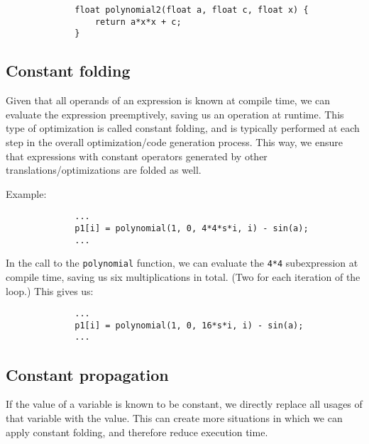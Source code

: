 \documentclass[twoside]{article}
\begin{document}
    \begin{figure}[h!]
        \centering
        \begin{verbatim}
        float polynomial2(float a, float c, float x) {
            return a*x*x + c;
        }
        \end{verbatim}
    \end{figure}
    
    \subsection{Constant folding}

    Given that all operands of an expression is known at compile time, we can evaluate the expression preemptively, saving us an operation at runtime.
    This type of optimization is called constant folding, and is typically performed at each step in the overall optimization/code generation process.
    This way, we ensure that expressions with constant operators generated by other translations/optimizations are folded as well.

    Example:

    \begin{figure}[h!]
        \centering
        \begin{verbatim}
        ...
        p1[i] = polynomial(1, 0, 4*4*s*i, i) - sin(a);
        ...
        \end{verbatim}
    \end{figure}

    In the call to the \texttt{polynomial} function, we can evaluate the \texttt{4*4} subexpression at compile time, saving us six multiplications in total. (Two for each iteration of the loop.)
    This gives us:

    \begin{figure}[h!]
        \centering
        \begin{verbatim}
        ...
        p1[i] = polynomial(1, 0, 16*s*i, i) - sin(a);
        ...
        \end{verbatim}
    \end{figure}

    \subsection{Constant propagation}

    If the value of a variable is known to be constant, we directly replace all usages of that variable with the value.
    This can create more situations in which we can apply constant folding, and therefore reduce execution time.
\end{document}
